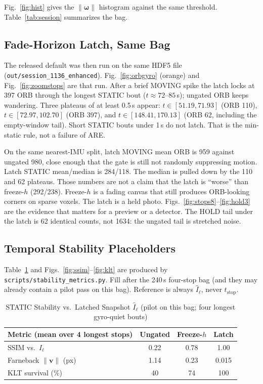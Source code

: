 \documentclass[journal]{IEEEtran}
\DeclareRobustCommand{\norm}[1]{\lVert #1 \rVert}
\begin{document}
Fig.~\ref{fig:hist} gives the \(\norm{\boldsymbol{\omega}}\) histogram against the
same threshold. Table~\ref{tab:session} summarizes the bag.

\subsection{Fade-Horizon Latch, Same Bag}
\label{sec:latch-results}
The released default was then run on the same HDF5 file
(\texttt{out/session\_1136\_enhanced}). Fig.~\ref{fig:orbgyro} (orange) and
Fig.~\ref{fig:zoomstops} are that run. After a brief MOVING spike the latch
locks at 397 ORB through the longest STATIC bout
(\(t \approx 72\)--\(85\)\,s); ungated ORB keeps wandering. Three plateaus of at
least 0.5\,s appear: \(t \in [51.19, 71.93]\) (ORB 110),
\(t \in [72.97, 102.70]\) (ORB 397), and \(t \in [148.41, 170.13]\) (ORB 62,
including the empty-window tail). Short STATIC bouts under 1\,s do not latch.
That is the min-static rule, not a failure of ARE.

On the same nearest-IMU split, latch MOVING mean ORB is 959 against ungated 980,
close enough that the gate is still not randomly suppressing motion. Latch
STATIC mean/median is 284/118. The median is pulled down by the 110 and 62
plateaus. Those numbers are not a claim that the latch is ``worse'' than
freeze-\(h\) (292/238). Freeze-\(h\) is a fading canvas that still produces
ORB-looking corners on sparse voxels. The latch is a held photo.
Figs.~\ref{fig:stops8}--\ref{fig:hold3} are the evidence that matters for a
preview or a detector. The HOLD tail under the latch is 62 identical counts, not
1634: the ungated tail is stretched noise.

\subsection{Temporal Stability Placeholders}
\label{sec:stab-results}
Table~\ref{tab:stability} and Figs.~\ref{fig:ssim}--\ref{fig:klt} are produced
by \texttt{scripts/stability\_metrics.py}. Fill after the 240\,s four-stop bag
(and they may already contain a pilot pass on this bag). Reference is always
\(\hat{I}_{\ell}\), never \(t_{\mathrm{stop}}\).

\begin{table}[!t]
\caption{STATIC Stability vs.\ Latched Snapshot \(\hat{I}_{\ell}\)
(pilot on this bag; four longest gyro-quiet bouts)}
\label{tab:stability}
\centering
\begin{tabular}{@{}lccc@{}}
\toprule
Metric (mean over 4 longest stops) & Ungated & Freeze-\(h\) & Latch \\
\midrule
SSIM vs.\ \(\hat{I}_{\ell}\) & 0.22 & 0.78 & 1.00 \\
Farneback \(\|\mathbf{v}\|\) (px) & 1.14 & 0.23 & 0.015 \\
KLT survival (\%) & 40 & 74 & 100 \\
\bottomrule
\end{tabular}
\end{table}
\end{document}
